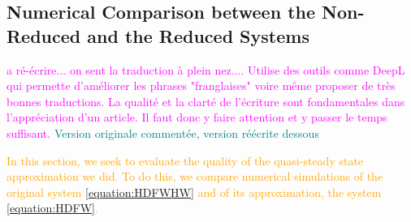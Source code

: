 \documentclass{article}
\newcommand{\marc}[1]{\textcolor{teal}{#1}}
\newcommand{\YD}[1]{\textcolor{magenta}{#1}}
\newcommand{\vdeux}[1]{\textcolor{orange}{#1}}
\theoremstyle{definition}
\theoremstyle{remark}
\begin{document}
\subsection{Numerical Comparison between the Non-Reduced and the Reduced Systems}
\YD{a ré-écrire... on sent la traduction à plein nez.... Utilise des outils comme DeepL qui permette d'améliorer les phrases "franglaises" voire même proposer de très bonnes traductions. La qualité et la clarté de l'écriture sont fondamentales dans l'appréciation d'un article. Il faut donc y faire attention et y passer le temps suffisant.}
\marc{Version originale commentée, version réécrite dessous}


%
%
%

\vdeux{In this section, we seek to evaluate the quality of the quasi-steady state approximation we did. To do this, we compare numerical simulations of the original system \eqref{equation:HDFWHW} and of its approximation, the system \eqref{equation:HDFW}.}
\end{document}
